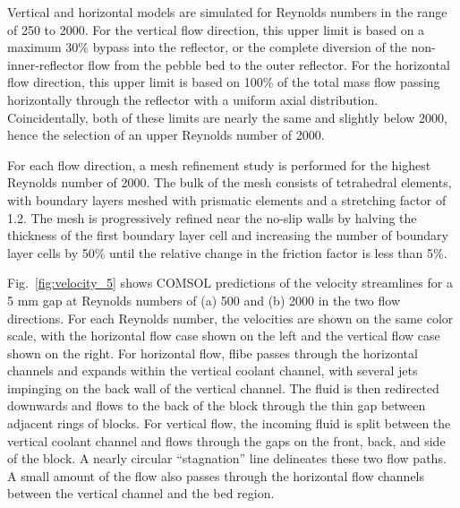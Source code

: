 Vertical and horizontal models are simulated for Reynolds numbers in the range of 250 to 2000. For the vertical flow direction, this upper limit is based on a maximum 30\% bypass into the reflector, or the complete diversion of the non-inner-reflector flow from the pebble bed to the outer reflector. For the horizontal flow direction, this upper limit is based on 100\% of the total mass flow passing horizontally through the reflector with a uniform axial distribution. Coincidentally, both of these limits are nearly the same and slightly below 2000, hence the selection of an upper Reynolds number of 2000.

For each flow direction, a mesh refinement study is performed for the highest Reynolds number of 2000. The bulk of the mesh consists of tetrahedral elements, with boundary layers meshed with prismatic elements and a stretching factor of 1.2. The mesh is progressively refined near the no-slip walls by halving the thickness of the first boundary layer cell and increasing the number of boundary layer cells by 50\% until the relative change in the friction factor is less than 5\%.

Fig.\ \ref{fig:velocity_5} shows COMSOL predictions of the velocity streamlines for a 5 \si{\milli\meter} gap at Reynolds numbers of (a) 500 and (b) 2000 in the two flow directions. For each Reynolds number, the velocities are shown on the same color scale, with the horizontal flow case shown on the left and the vertical flow case shown on the right. For horizontal flow, \gls{flibe} passes through the horizontal channels and expands within the vertical coolant channel, with several jets impinging on the back wall of the vertical channel. The fluid is then redirected downwards and flows to the back of the block through the thin gap between adjacent rings of blocks. For vertical flow, the incoming fluid is split between the vertical coolant channel and flows through the gaps on the front, back, and side of the block. A nearly circular ``stagnation'' line delineates these two flow paths. A small amount of the flow also passes through the horizontal flow channels between the vertical channel and the bed region.  

